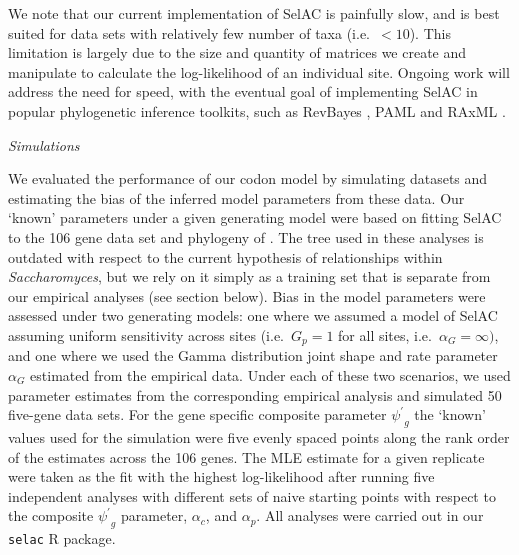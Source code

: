 \documentclass[12pt,letterpaper,fleqn]{article}
\renewcommand{\subsection}[1]{%
\bigskip
\begin{center}
\begin{large}
\normalfont\itshape #1
\end{large}
\end{center}}
\newcommand{\selac}{SelAC\xspace}
\newcommand{\alphac}{\ensuremath{\alpha_c}\xspace}
\newcommand{\alphag}{\ensuremath{\alpha_G}\xspace}
\newcommand{\alphap}{\ensuremath{\alpha_p}\xspace}
\newcommand{\psiprime}{\ensuremath{\psi^\prime}\xspace}
\newcommand{\gp}{\ensuremath{{G_p}}\xspace}
\begin{document}
We note that our current implementation of \selac is painfully slow, and is best suited for data sets with relatively few number of taxa (i.e.~$<10$).
This limitation is largely due to the size and quantity of matrices we create and manipulate to calculate the log-likelihood of an individual site.
Ongoing work will address the need for speed, with the eventual goal of implementing \selac in popular phylogenetic inference toolkits, such as RevBayes \citep{revbayes}, PAML \citep{Yang2007} and RAxML \citep{Stamatakis2006}.

\subsection{Simulations}
We evaluated the performance of our codon model by simulating datasets and estimating the bias of the inferred model parameters from these data.
Our `known' parameters under a given generating model were based on fitting SelAC to the 106 gene data set and phylogeny of \citet{RokasEtAl2003}.
The tree used in these analyses is outdated with respect to the current hypothesis of relationships within \emph{Saccharomyces}, but we rely on it simply as a training set that is separate from our empirical analyses (see section below).
Bias in the model parameters were assessed under two generating models: one where we assumed a model of SelAC assuming uniform sensitivity across sites (i.e.~$\gp = 1$ for all sites, i.e.~$\alphag = \infty)$, and one where we used the Gamma distribution joint shape and rate parameter $\alphag$ estimated from the empirical data.
Under each of these two scenarios, we used parameter estimates from the corresponding empirical analysis and simulated 50 five-gene data sets.
For the gene specific composite parameter $\psiprime_g$ the `known' values used for the simulation were five evenly spaced points along the rank order of the estimates across the 106 genes.
The MLE estimate for a given replicate were taken as the fit with the highest log-likelihood after running five independent analyses with different sets of naive starting points with respect to the composite $\psiprime_g$ parameter, $\alphac$, and $\alphap$.
All analyses were carried out in our \texttt{selac} R package.
\end{document}
